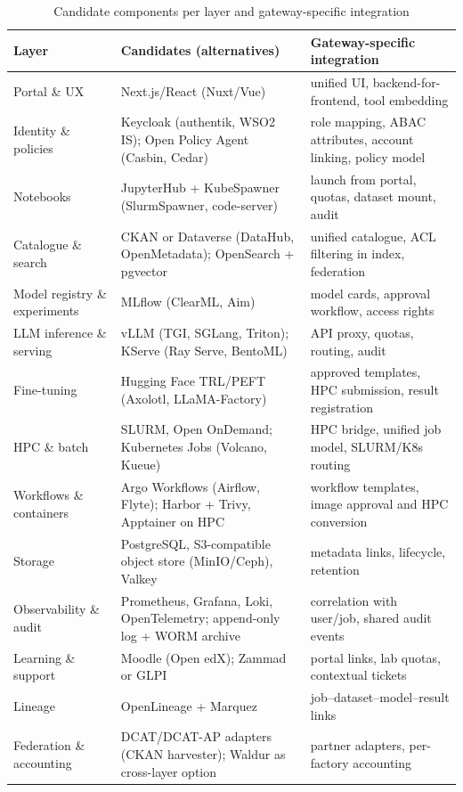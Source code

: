 \documentclass[conference,a4paper]{IEEEtran}
\begin{document}
\begin{table}[t]
\centering
\caption{Candidate components per layer and gateway-specific integration}
\label{tab:tools}
\footnotesize
\renewcommand{\arraystretch}{1.08}
\begin{tabular}{@{}p{3.0cm}p{7.2cm}p{6.6cm}@{}}
\toprule
\textbf{Layer} & \textbf{Candidates (alternatives)} & \textbf{Gateway-specific integration} \\
\midrule
Portal \& UX & Next.js/React (Nuxt/Vue) & unified UI, backend-for-frontend, tool embedding \\
Identity \& policies & Keycloak (authentik, WSO2 IS); Open Policy Agent (Casbin, Cedar) & role mapping, ABAC attributes, account linking, policy model \\
Notebooks & JupyterHub + KubeSpawner (SlurmSpawner, code-server) & launch from portal, quotas, dataset mount, audit \\
Catalogue \& search & CKAN or Dataverse (DataHub, OpenMetadata); OpenSearch + pgvector & unified catalogue, ACL filtering in index, federation \\
Model registry \& experiments & MLflow (ClearML, Aim) & model cards, approval workflow, access rights \\
LLM inference \& serving & vLLM (TGI, SGLang, Triton); KServe (Ray Serve, BentoML) & API proxy, quotas, routing, audit \\
Fine-tuning & Hugging Face TRL/PEFT (Axolotl, LLaMA-Factory) & approved templates, HPC submission, result registration \\
HPC \& batch & SLURM, Open OnDemand; Kubernetes Jobs (Volcano, Kueue) & HPC bridge, unified job model, SLURM/K8s routing \\
Workflows \& containers & Argo Workflows (Airflow, Flyte); Harbor + Trivy, Apptainer on HPC & workflow templates, image approval and HPC conversion \\
Storage & PostgreSQL, S3-compatible object store (MinIO/Ceph), Valkey & metadata links, lifecycle, retention \\
Observability \& audit & Prometheus, Grafana, Loki, OpenTelemetry; append-only log + WORM archive & correlation with user/job, shared audit events \\
Learning \& support & Moodle (Open edX); Zammad or GLPI & portal links, lab quotas, contextual tickets \\
Lineage & OpenLineage + Marquez & job--dataset--model--result links \\
Federation \& accounting & DCAT/DCAT-AP adapters (CKAN harvester); Waldur as cross-layer option & partner adapters, per-factory accounting \\
\bottomrule
\end{tabular}
\end{table}
\end{document}

